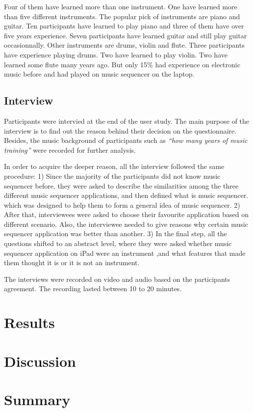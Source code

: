 Four of them have learned more than one instrument. One have learned more than five different instruments. The popular pick of instruments are piano and guitar. Ten participants have learned to play piano and three of them have over five years experience. Seven participants have learned guitar and still play guitar occasionnally. Other instruments are drums, violin and flute. Three participants have experience playing drums. Two have learned to play violin. Two have learned some flute many years ago. But only 15\% had experience on electronic music before and had played on music sequencer on the laptop.

\subsection{Interview}

Participants were intervied at the end of the user study. The main purpose of the interview is to find out the reason behind their decision on the questionnaire. Besides, the music background of participants such as \textit{\textquotedblleft{how many years of music training}\textquotedblright} were recorded for further analysis.

In order to acquire the deeper reason, all the interview followed the same procedure: 1) Since the majority of the participants did not know music sequencer before, they were asked to describe the similarities among the three different music sequencer applications, and then defined what is music sequencer. which was designed to help them to form a general idea of music sequencer. 2) After that, interviewees were asked to choose their favourite application based on different scenario. Also, the interviewee needed to give reasons why certain music sequencer application was better than another. 3) In the final step, all the questions shifted to an abstract level, where they were asked whether music sequencer application on iPad were an instrument ,and what features that made them thought it is or it is not an instrument.

The interviews were recorded on video and audio based on the participants agreement. The recording lasted between 10 to 20 minutes.

\section{Results}

\section{Discussion}

\section{Summary}
